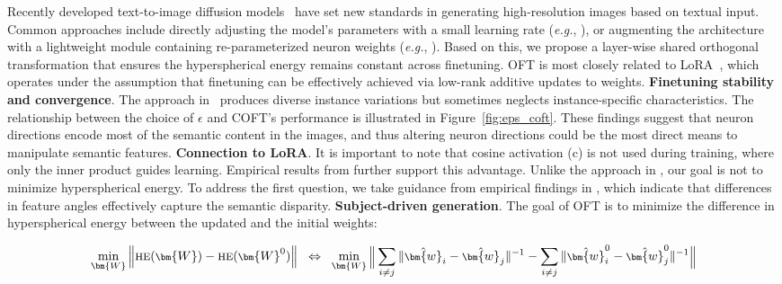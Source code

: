 Recently developed text-to-image diffusion models~\cite{saharia2022photorealistic,ramesh2022hierarchical,rombach2022high} have set new standards in generating high-resolution images based on textual input. Common approaches include directly adjusting the model's parameters with a small learning rate (\emph{e.g.}, \cite{ruiz2023dreambooth}), or augmenting the architecture with a lightweight module containing re-parameterized neuron weights (\emph{e.g.}, \cite{hulora2022,zhang2023adding}). Based on this, we propose a layer-wise shared orthogonal transformation that ensures the hyperspherical energy remains constant across finetuning. OFT is most closely related to LoRA~\cite{hulora2022}, which operates under the assumption that finetuning can be effectively achieved via low-rank additive updates to weights. \textbf{Finetuning stability and convergence}. The approach in~\cite{casanova2021instance} produces diverse instance variations but sometimes neglects instance-specific characteristics. The relationship between the choice of $\epsilon$ and COFT’s performance is illustrated in Figure~\ref{fig:eps_coft}. These findings suggest that neuron directions encode most of the semantic content in the images, and thus altering neuron directions could be the most direct means to manipulate semantic features. \textbf{Connection to LoRA}. It is important to note that cosine activation (c) is not used during training, where only the inner product guides learning. Empirical results from \cite{liu2021orthogonal} further support this advantage. Unlike the approach in \cite{liu2021orthogonal}, our goal is not to minimize hyperspherical energy. To address the first question, we take guidance from empirical findings in \cite{liu2018decoupled,chen2020angular}, which indicate that differences in feature angles effectively capture the semantic disparity. \textbf{Subject-driven generation}. The goal of OFT is to minimize the difference in hyperspherical energy between the updated and the initial weights:

\begin{equation}\label{eq:oft_principle}
\footnotesize
\min_{\bm{W}} \left\| \text{HE}(\bm{W})-\text{HE}(\bm{W}^0)\right\|~~\Leftrightarrow~~\min_{\bm{W}} \bigg{\|} \sum_{i\neq j} \|\hat{\bm{w}}_i-\hat{\bm{w}}_j\|^{-1}-\sum_{i\neq j} \|\hat{\bm{w}}^0_i-\hat{\bm{w}}^0_j\|^{-1}\bigg{\|}
\end{equation}

